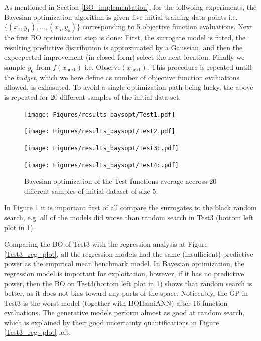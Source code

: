 As mentioned in Section \ref{BO_implementation}, for the follwoing experiments, the Bayesian
optimization algorithm is given five initial training data points i.e. $\{(x_1, y_1), \dots, (x_5,
y_5)\}$ corresponding to 5 objective function evaluations. Next the first BO optimization step is
done: First, the surrogate model is fitted, the resulting predictive distribution is approximated by
a Gaussian, and then the expecpected improvement (in closed form) select the next location. Finally
we sample $y_6$ from $f(x_{\text{next}})$ i.e. $\text{Observe}(x_{\text{next}})$. This procedure is
repeated untill the \textit{budget}, which we here define as number of objective function
evaluations allowed, is exhasuted. To avoid a single optimization path being lucky, the above is
repeated for 20 different samples of the initial data set. 
\begin{figure}[b]
  \centering
  \begin{minipage}[b]{0.49\textwidth}
   \texttt{[image: Figures/results\_baysopt/Test1.pdf]}
  \end{minipage}
  \hfill
  \begin{minipage}[b]{0.49\textwidth}
    \texttt{[image: Figures/results\_baysopt/Test2.pdf]}
   \end{minipage}
   \begin{minipage}[b]{0.49\textwidth}
    \texttt{[image: Figures/results\_baysopt/Test3c.pdf]}
   \end{minipage}
   \hfill
   \begin{minipage}[b]{0.49\textwidth}
     \texttt{[image: Figures/results\_baysopt/Test4c.pdf]}
    \end{minipage}
  \caption{Bayesian optimization of the Test functions average accross 20 different samples of initial dataset of size 5.}
  \label{Test_bayesOpt}
\end{figure}
In Figure \ref{Test_bayesOpt} it is important first of all compare the surrogates to the black random search, e.g.
all of the models did worse than random search in Test3 (bottom left plot in \ref{Test_bayesOpt}).

Comparing the BO of Test3 with the regression analysis at Figure \ref{Test3_reg_plot}, all the
regression models had the same (insufficient) predictive power as the empirical mean benchmark
model. In Bayesian optimization, the regression model is important for exploitation, however, if it
has no predictive power, then the BO on Test3(bottom left plot in \ref{Test_bayesOpt}) shows that
random search is better, as it does not bias toward any parts of the space. Noticeably, the GP in
Test3 is the worst model (together with BOHamiANN) after 16 function evaluations. The generative
models perform almost as good at random search, which is explained by their good uncertainty
quantifications in Figure \ref{Test3_reg_plot} left.

